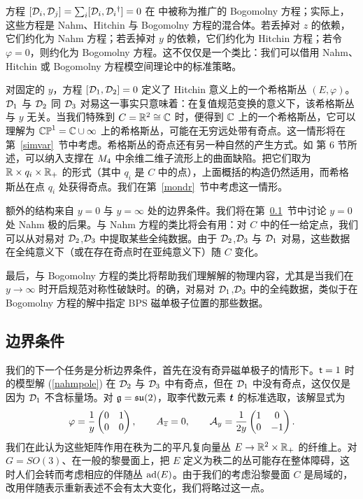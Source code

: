方程 $[\D_i,\D_j]=\sum_i[\D_i,\D_i{}^\dagger]=0$ 在 \cite{KW} 中被称为推广的 Bogomolny 方程；实际上，这些方程是 Nahm、Hitchin 与 Bogomolny 方程的混合体。若丢掉对 $z$ 的依赖，它们约化为 Nahm 方程；若丢掉对 $y$ 的依赖，它们约化为 Hitchin 方程；若令 $\varphi=0$，则约化为 Bogomolny 方程。这不仅仅是一个类比：我们可以借用 Nahm、Hitchin 或 Bogomolny 方程模空间理论中的标准策略。

对固定的 $y$，方程 $[\D_1,\D_2]=0$ 定义了 Hitchin 意义上的一个希格斯丛 $(E,\varphi)$。$\D_1$ 与 $\D_2$ 同 $\D_3$ 对易这一事实只意味着：在复值规范变换的意义下，该希格斯丛与 $y$ 无关。当我们特殊到 $C=\R^2\cong \C$ 时，便得到 $\C$ 上的一个希格斯丛，它可以理解为 $\CP^1=\C\cup \infty$ 上的希格斯丛，可能在无穷远处带有奇点。这一情形将在第~\ref{simvar}~节中考虑。希格斯丛的奇点还有另一种自然的产生方式。如 \cite{fiveknots} 第 6 节所述，可以纳入支撑在 $\MM$ 中余维二维子流形上的曲面缺陷。把它们取为 $\R\times q_i \times \R_+$ 的形式（其中 $q_i$ 是 $C$ 中的点），上面概括的构造仍然适用，而希格斯丛在点 $q_i$ 处获得奇点。我们在第~\ref{mondr}~节中考虑这一情形。

额外的结构来自 $y=0$ 与 $y=\infty$ 处的边界条件。我们将在第~\ref{bc}~节中讨论 $y=0$ 处 Nahm 极的后果。与 Nahm 方程的类比将会有用：对 $C$ 中的任一给定点，我们可以从对易对 $\D_2$,$\D_3$ 中提取某些全纯数据。由于 $\D_2$,$\D_3$ 与 $\D_1$ 对易，这些数据在全纯意义下（或在存在奇点时在亚纯意义下）随 $C$ 变化。

最后，与 Bogomolny 方程的类比将帮助我们理解解的物理内容，尤其是当我们在 $y\to\infty$ 时开启规范对称性破缺时。的确，对易对 $\D_1$,$\D_3$ 中的全纯数据，类似于在 Bogomolny 方程的解中指定 BPS 磁单极子位置的那些数据。

\subsection{边界条件}\label{bc}
我们的下一个任务是分析边界条件，首先在没有奇异磁单极子的情形下。$\t=1$ 时的模型解 (\ref{nahmpole}) 在 $\D_2$ 与 $\D_3$ 中有奇点，但在 $\D_1$ 中没有奇点，这仅仅是因为 $\D_1$ 不含标量场。对 $ \frak g = \frak{su}(2)$，取李代数元素 $\ct$ 的标准选取，该解显式为
\begin{equation}\label{burg}
\varphi = \frac{1}{y} \begin{pmatrix} 0 & 1 \cr 0 & 0\end{pmatrix},
\qquad A_{\bar z}=0, \qquad \A_y = \frac{1}{2y} \begin{pmatrix} 1 & 0 \cr 0 & -1\end{pmatrix}.
\end{equation}
我们在此认为这些矩阵作用在秩为二的平凡复向量丛 $E\to \R^2\times\R_+$ 的纤维上。对 $G=SO(3)$、在一般的黎曼面上，把 $E$ 定义为秩二的丛可能存在整体障碍，这时人们会转而考虑相应的伴随丛 $\ad(E)$。由于我们的考虑沿黎曼面 $C$ 是局域的，改用伴随表示重新表述不会有太大变化，我们将略过这一点。


